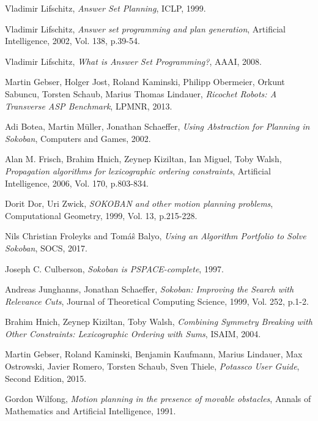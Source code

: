 \documentclass{report}
\begin{document}
\begin{thebibliography}{}
Vladimir Lifschitz,
\textit{Answer Set Planning},
ICLP, 1999.

Vladimir Lifschitz,
\textit{Answer set programming and plan generation},
Artificial Intelligence, 2002, Vol. 138, p.39-54.

Vladimir Lifschitz,
\textit{What is Answer Set Programming?},
AAAI, 2008.

Martin Gebser, Holger Jost, Roland Kaminski, Philipp Obermeier, Orkunt Sabuncu, Torsten Schaub, Marius Thomas Lindauer,
\textit{Ricochet Robots: A Transverse ASP Benchmark},
LPMNR, 2013.

Adi Botea, Martin Müller, Jonathan Schaeffer,
\textit{Using Abstraction for Planning in Sokoban},
Computers and Games, 2002.

Alan M. Frisch, Brahim Hnich, Zeynep Kiziltan, Ian Miguel, Toby Walsh,
\textit{Propagation algorithms for lexicographic ordering constraints},
Artificial Intelligence, 2006, Vol. 170, p.803-834.

Dorit Dor, Uri Zwick,
\textit{SOKOBAN and other motion planning problems},
Computational Geometry, 1999, Vol. 13, p.215-228.

Nils Christian Froleyks and Tom{\'a}{\^s} Balyo,
\textit{Using an Algorithm Portfolio to Solve Sokoban},
SOCS, 2017.

Joseph C. Culberson,
\textit{Sokoban is PSPACE-complete},
1997.

Andreas Junghanns, Jonathan Schaeffer,
\textit{Sokoban: Improving the Search with Relevance Cuts},
Journal of Theoretical Computing Science, 1999, Vol. 252, p.1-2.

Brahim Hnich, Zeynep Kiziltan, Toby Walsh,
\textit{Combining Symmetry Breaking with Other Constraints: Lexicographic Ordering with Sums},
ISAIM, 2004.

Martin Gebser, Roland Kaminski, Benjamin Kaufmann, Marius Lindauer, Max Ostrowski, Javier Romero, Torsten Schaub, Sven Thiele,
\textit{Potassco User Guide},
Second Edition, 2015.

Gordon Wilfong,
\textit{Motion planning in the presence of movable obstacles},
Annals of Mathematics and Artificial Intelligence, 1991.
\end{thebibliography}
\end{document}
